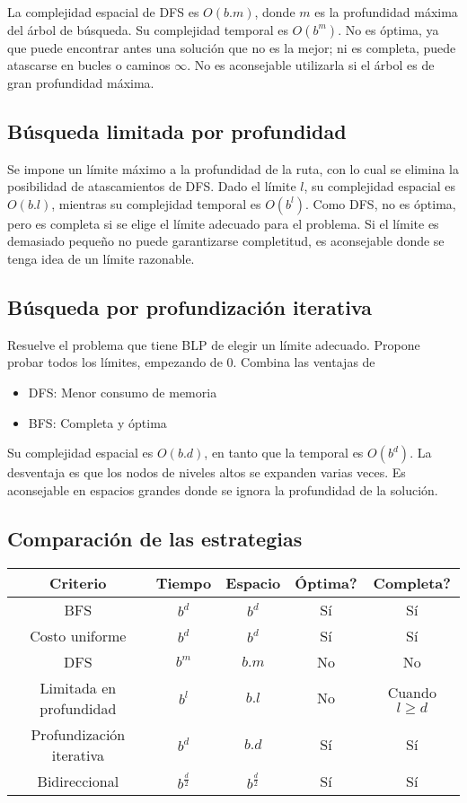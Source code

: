 \documentclass[a4paper,10pt]{paper}
\begin{document}
La complejidad espacial de DFS es $O(b.m)$, donde $m$ es la profundidad máxima
del árbol de búsqueda. Su complejidad temporal es $O(b^m)$. No es óptima, ya que
puede encontrar antes una solución que no es la mejor; ni es completa, puede
atascarse en bucles o caminos $\infty$. No es aconsejable utilizarla si el
árbol es de gran profundidad máxima.

\subsection{Búsqueda limitada por profundidad}
Se impone un límite máximo a la profundidad de la ruta, con lo cual se elimina
la posibilidad de atascamientos de DFS. Dado el límite $l$, su complejidad
espacial es $O(b.l)$, mientras su complejidad temporal es $O(b^l)$. Como DFS,
no es óptima, pero es completa si se elige el límite adecuado para el problema.
Si el límite es demasiado pequeño no puede garantizarse completitud, es
aconsejable donde se tenga idea de un límite razonable.

\subsection{Búsqueda por profundización iterativa}
Resuelve el problema que tiene BLP de elegir un límite adecuado. Propone probar
todos los límites, empezando de 0. Combina las ventajas de
\begin{itemize}
    \item DFS: Menor consumo de memoria
    \item BFS: Completa y óptima
\end{itemize}
Su complejidad espacial es $O(b.d)$, en tanto que la temporal es $O(b^d)$.
La desventaja es que los nodos de niveles altos se expanden varias veces. Es
aconsejable en espacios grandes donde se ignora la profundidad de la solución.

\subsection{Comparación de las estrategias}
\begin{tabular}{| c | c | c | c | c |}
\hline
Criterio & Tiempo & Espacio & Óptima? & Completa? \\
\hline
BFS & $b^d$ & $b^d$ & Sí & Sí \\
\hline
Costo uniforme & $b^d$ & $b^d$ & Sí & Sí \\
\hline
DFS & $b^m$ & $b.m$ & No & No \\
\hline
Limitada en profundidad & $b^l$ & $b.l$ & No & Cuando $l \geq d$ \\
\hline
Profundización iterativa & $b^d$ & $b.d$ & Sí & Sí \\
\hline
Bidireccional & $b^{\frac{d}{2}}$ & $b^{\frac{d}{2}}$ & Sí & Sí \\
\hline
\end{tabular}
\end{document}
